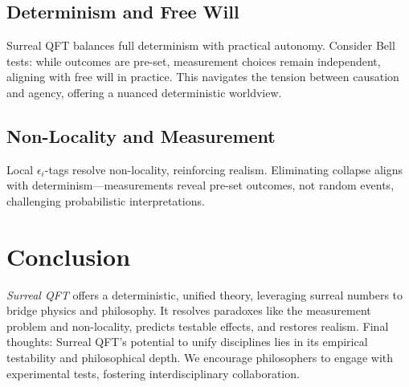 \documentclass{article}
\begin{document}
\subsection{Determinism and Free Will}
Surreal QFT balances full determinism with practical autonomy. Consider Bell tests: while outcomes are pre-set, measurement choices remain independent, aligning with free will in practice. This navigates the tension between causation and agency, offering a nuanced deterministic worldview.

\subsection{Non-Locality and Measurement}
Local \(\epsilon_i\)-tags resolve non-locality, reinforcing realism. Eliminating collapse aligns with determinism---measurements reveal pre-set outcomes, not random events, challenging probabilistic interpretations.

\section{Conclusion}
\textit{Surreal QFT} offers a deterministic, unified theory, leveraging surreal numbers to bridge physics and philosophy. It resolves paradoxes like the measurement problem and non-locality, predicts testable effects, and restores realism. Final thoughts: Surreal QFT's potential to unify disciplines lies in its empirical testability and philosophical depth. We encourage philosophers to engage with experimental tests, fostering interdisciplinary collaboration.
\end{document}
